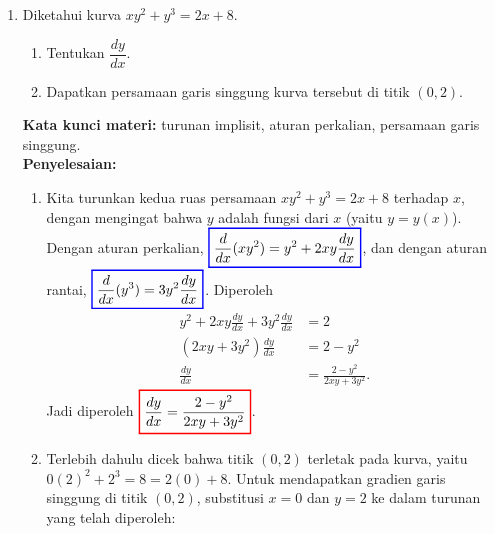 \documentclass[10pt,openany,a4paper]{article}
\theoremstyle{definition}
\theoremstyle{definition}
\theoremstyle{plain}
\newenvironment{jawab}[2][tes]{%
\par\noindent\textbf{Kata kunci materi:} #1.\\
\textbf{Penyelesaian:} #2%
}{}
\begin{document}
\begin{enumerate}
\begin{jawab}[fungsi kontinu, limit sepihak, turunan sepihak]
{        \begin{align*}
            f'_+(1) = \lim_{h\to 0^+}\frac{f(1+h)-f(1)}{h} = \lim_{h\to 0^+}\frac{4(1+h)-2-2}{h} = \lim_{h\to 0^+}\frac{4h}{h} = \colorlet{oldcolor}{.}
        \color{blue}
        \setlength{\fboxrule}{1pt} \boxed{\color{oldcolor}4}\color{oldcolor}.
        \end{align*}
        Karena $f'_-(1)=2\neq 4=f'_+(1)$, maka $f'(1)$ tidak ada. Jadi terbukti bahwa
        \[\colorlet{oldcolor}{.}
        \color{red}
        \setlength{\fboxrule}{1pt} \boxed{\color{oldcolor}f \text{ kontinu tetapi tidak dapat diturunkan di } x=1}\color{oldcolor}.\]
        Secara grafik, di titik $(1,2)$ grafik $f$ membentuk ``sudut'' (tidak mulus).
    }
    \end{jawab}

    \item Diketahui kurva $xy^2+y^3=2x+8$.
    \begin{enumerate}
        \item Tentukan $\dfrac{dy}{dx}$.
        \item Dapatkan persamaan garis singgung kurva tersebut di titik $(0,2)$.
    \end{enumerate}
    \begin{jawab}[turunan implisit, aturan perkalian, persamaan garis singgung]{
        \begin{enumerate}
            \item Kita turunkan kedua ruas persamaan $xy^2+y^3=2x+8$ terhadap $x$, dengan mengingat bahwa $y$ adalah fungsi dari $x$ (yaitu $y=y(x)$). Dengan aturan perkalian, $\colorlet{oldcolor}{.}
        \color{blue}
        \setlength{\fboxrule}{1pt} \boxed{\color{oldcolor}\frac{d}{dx}(xy^2) = y^2 + 2xy\frac{dy}{dx}}\color{oldcolor}$, dan dengan aturan rantai, $\colorlet{oldcolor}{.}
        \color{blue}
        \setlength{\fboxrule}{1pt} \boxed{\color{oldcolor}\frac{d}{dx}(y^3) = 3y^2\frac{dy}{dx}}\color{oldcolor}$. Diperoleh
            \begin{align*}
                y^2 + 2xy\frac{dy}{dx} + 3y^2\frac{dy}{dx} &= 2\\
                (2xy + 3y^2)\frac{dy}{dx} &= 2 - y^2\\
                \frac{dy}{dx} &= \frac{2 - y^2}{2xy + 3y^2}.
            \end{align*}
            Jadi diperoleh $\colorlet{oldcolor}{.}
        \color{red}
        \setlength{\fboxrule}{1pt} \boxed{\color{oldcolor}\frac{dy}{dx} = \frac{2 - y^2}{2xy + 3y^2}}\color{oldcolor}$.
            \item Terlebih dahulu dicek bahwa titik $(0,2)$ terletak pada kurva, yaitu $0(2)^2+2^3=8=2(0)+8$. Untuk mendapatkan gradien garis singgung di titik $(0,2)$, substitusi $x=0$ dan $y=2$ ke dalam turunan yang telah diperoleh:

\end{enumerate}}
\end{jawab}
\end{enumerate}
\end{document}
